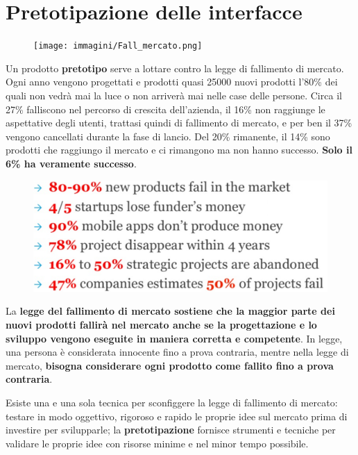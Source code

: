 \chapter{Pretotipazione delle interfacce}
\begin{figure}[!h]
	\centering
	\texttt{[image: immagini/Fall\_mercato.png]}
\end{figure}

Un prodotto \textbf{pretotipo} serve a lottare contro la legge di fallimento di mercato. Ogni anno vengono progettati e prodotti quasi 25000 nuovi prodotti
l'80\% dei quali non vedrà mai la luce o non arriverà mai nelle case delle persone. Circa il 27\% falliscono nel percorso di crescita dell'azienda, il
16\% non raggiunge le aspettative degli utenti, trattasi quindi di fallimento di mercato, e per ben il 37\% vengono cancellati durante la fase di lancio.
Del 20\% rimanente, il 14\% sono prodotti che raggiungo il mercato e ci rimangono ma non hanno successo. \textbf{Solo il 6\% ha veramente successo}.

\begin{figure}[!h]
	\centering
	\includegraphics[scale=0.15]{immagini/legge-fallimento-di-mercato.png}
\end{figure}

La \textbf{legge del fallimento di mercato sostiene che la maggior parte dei nuovi prodotti fallirà nel mercato anche se la progettazione e lo sviluppo
vengono eseguite in maniera corretta e competente}. In legge, una persona è considerata innocente fino a prova contraria, mentre nella legge di mercato,
\textbf{bisogna considerare ogni prodotto come fallito fino a prova contraria}.

Esiste una e una sola tecnica per sconfiggere la legge di fallimento di mercato: testare in modo oggettivo, rigoroso e rapido le proprie idee sul mercato
prima di investire per svilupparle; la \textbf{pretotipazione} fornisce strumenti e tecniche per validare le proprie idee con risorse minime e nel minor
tempo possibile.

